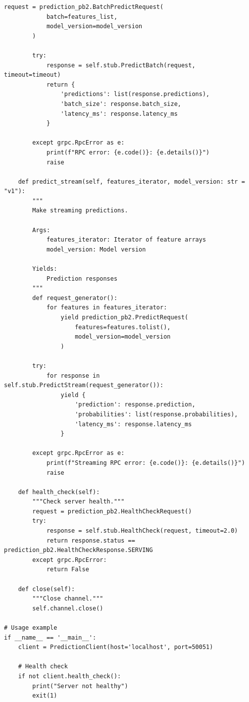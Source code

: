 \begin{lstlisting}[style=python, caption=gRPC client implementation]
        request = prediction_pb2.BatchPredictRequest(
            batch=features_list,
            model_version=model_version
        )

        try:
            response = self.stub.PredictBatch(request, timeout=timeout)
            return {
                'predictions': list(response.predictions),
                'batch_size': response.batch_size,
                'latency_ms': response.latency_ms
            }

        except grpc.RpcError as e:
            print(f"RPC error: {e.code()}: {e.details()}")
            raise

    def predict_stream(self, features_iterator, model_version: str = "v1"):
        """
        Make streaming predictions.

        Args:
            features_iterator: Iterator of feature arrays
            model_version: Model version

        Yields:
            Prediction responses
        """
        def request_generator():
            for features in features_iterator:
                yield prediction_pb2.PredictRequest(
                    features=features.tolist(),
                    model_version=model_version
                )

        try:
            for response in self.stub.PredictStream(request_generator()):
                yield {
                    'prediction': response.prediction,
                    'probabilities': list(response.probabilities),
                    'latency_ms': response.latency_ms
                }

        except grpc.RpcError as e:
            print(f"Streaming RPC error: {e.code()}: {e.details()}")
            raise

    def health_check(self):
        """Check server health."""
        request = prediction_pb2.HealthCheckRequest()
        try:
            response = self.stub.HealthCheck(request, timeout=2.0)
            return response.status == prediction_pb2.HealthCheckResponse.SERVING
        except grpc.RpcError:
            return False

    def close(self):
        """Close channel."""
        self.channel.close()

# Usage example
if __name__ == '__main__':
    client = PredictionClient(host='localhost', port=50051)

    # Health check
    if not client.health_check():
        print("Server not healthy")
        exit(1)


\end{lstlisting}
